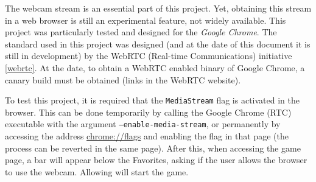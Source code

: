 \label{sec:setup}

The webcam stream is an essential part of this project. Yet, obtaining this stream in a web browser is still an experimental feature, not widely available. This project was particularly tested and designed for the \textit{Google Chrome}. The standard used in this project was designed (and at the date of this document it is still in development) by the WebRTC (Real-time Communications) initiative \cref{webrtc}. At the date, to obtain a WebRTC enabled binary of Google Chrome, a canary build must be obtained (links in the WebRTC website).

To test this project, it is required that the \texttt{MediaStream} flag is activated in the browser. This can be done temporarily by calling the Google Chrome (RTC) executable with the argument \texttt{--enable-media-stream}, or permanently by accessing the address \url{chrome://flags} and enabling the flag in that page (the process can be reverted in the same page). After this, when accessing the game page, a bar will appear below the Favorites, asking if the user allows the browser to use the webcam. Allowing will start the game.

